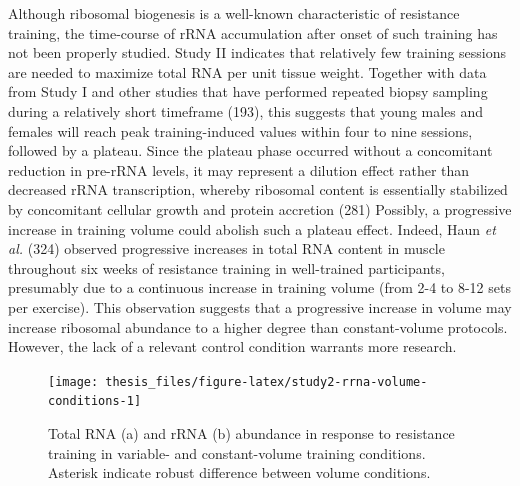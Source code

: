 \documentclass[twoside,10pt]{gihclass} %
\begin{document}
Although ribosomal biogenesis is a well-known characteristic of resistance training, the time-course of rRNA accumulation after onset of such training has not been properly studied.
Study II indicates that relatively few training sessions are needed to maximize total RNA per unit tissue weight.
Together with data from Study I and other studies that have performed repeated biopsy sampling during a relatively short timeframe (193), this suggests that young males and females will reach peak training-induced values within four to nine sessions, followed by a plateau.
Since the plateau phase occurred without a concomitant reduction in pre-rRNA levels, it may represent a dilution effect rather than decreased rRNA transcription, whereby ribosomal content is essentially stabilized by concomitant cellular growth and protein accretion
(281)
Possibly, a progressive increase in training volume could abolish such a plateau effect.
Indeed, Haun \emph{et al.}
(324)
observed progressive increases in total RNA content in muscle throughout six weeks of resistance training in well-trained participants, presumably due to a continuous increase in training volume (from 2-4 to 8-12 sets per exercise). This observation suggests that a progressive increase in volume may increase ribosomal abundance to a higher degree than constant-volume protocols.
However, the lack of a relevant control condition warrants more research.
\begin{figure}

{\centering \texttt{[image: thesis\_files/figure-latex/study2-rrna-volume-conditions-1]} 

}

\caption[Total RNA and rRNA abundance in response to training in Study II.]{Total RNA (a) and rRNA (b) abundance in response to resistance training in variable- and constant-volume training conditions. Asterisk indicate robust difference between volume conditions.}\label{fig:study2-rrna-volume-conditions}
\end{figure}
\end{document}
